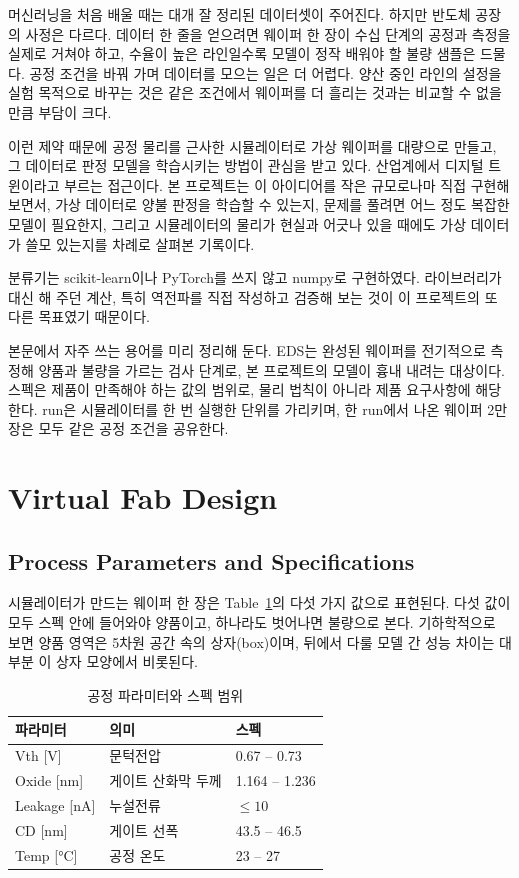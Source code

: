 \documentclass[10pt,twocolumn,a4paper]{article}
\begin{document}
머신러닝을 처음 배울 때는 대개 잘 정리된 데이터셋이 주어진다. 하지만 반도체 공장의 사정은
다르다. 데이터 한 줄을 얻으려면 웨이퍼 한 장이 수십 단계의 공정과 측정을 실제로 거쳐야 하고,
수율이 높은 라인일수록 모델이 정작 배워야 할 불량 샘플은 드물다. 공정 조건을 바꿔 가며
데이터를 모으는 일은 더 어렵다. 양산 중인 라인의 설정을 실험 목적으로 바꾸는 것은 같은
조건에서 웨이퍼를 더 흘리는 것과는 비교할 수 없을 만큼 부담이 크다.

이런 제약 때문에 공정 물리를 근사한 시뮬레이터로 가상 웨이퍼를 대량으로 만들고, 그 데이터로
판정 모델을 학습시키는 방법이 관심을 받고 있다. 산업계에서 디지털 트윈이라고 부르는 접근이다.
본 프로젝트는 이 아이디어를 작은 규모로나마 직접 구현해 보면서, 가상 데이터로 양불 판정을
학습할 수 있는지, 문제를 풀려면 어느 정도 복잡한 모델이 필요한지, 그리고 시뮬레이터의 물리가
현실과 어긋나 있을 때에도 가상 데이터가 쓸모 있는지를 차례로 살펴본 기록이다.

분류기는 scikit-learn이나 PyTorch를 쓰지 않고 numpy로 구현하였다. 라이브러리가 대신
해 주던 계산, 특히 역전파를 직접 작성하고 검증해 보는 것이 이 프로젝트의 또 다른 목표였기
때문이다.

본문에서 자주 쓰는 용어를 미리 정리해 둔다. EDS는 완성된 웨이퍼를 전기적으로 측정해 양품과
불량을 가르는 검사 단계로, 본 프로젝트의 모델이 흉내 내려는 대상이다. 스펙은 제품이 만족해야
하는 값의 범위로, 물리 법칙이 아니라 제품 요구사항에 해당한다. run은 시뮬레이터를 한 번
실행한 단위를 가리키며, 한 run에서 나온 웨이퍼 2만 장은 모두 같은 공정 조건을 공유한다.

\section{Virtual Fab Design}

\subsection{Process Parameters and Specifications}

시뮬레이터가 만드는 웨이퍼 한 장은 Table~\ref{tab:spec}의 다섯 가지 값으로 표현된다. 다섯 값이
모두 스펙 안에 들어와야 양품이고, 하나라도 벗어나면 불량으로 본다. 기하학적으로 보면 양품
영역은 5차원 공간 속의 상자(box)이며, 뒤에서 다룰 모델 간 성능 차이는 대부분 이 상자 모양에서
비롯된다.

\begin{table}[t]
\centering\small
\caption{공정 파라미터와 스펙 범위}
\label{tab:spec}
\begin{tabular}{lll}
\toprule
파라미터 & 의미 & 스펙 \\
\midrule
Vth [V]      & 문턱전압      & 0.67 -- 0.73 \\
Oxide [nm]   & 게이트 산화막 두께 & 1.164 -- 1.236 \\
Leakage [nA] & 누설전류      & $\le 10$ \\
CD [nm]      & 게이트 선폭    & 43.5 -- 46.5 \\
Temp [°C]    & 공정 온도      & 23 -- 27 \\
\bottomrule
\end{tabular}
\end{table}
\end{document}

